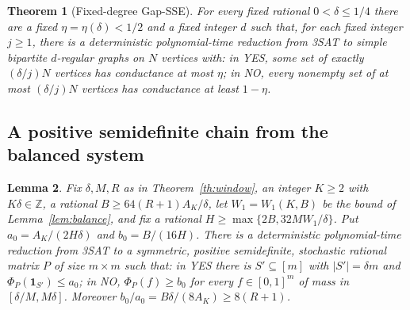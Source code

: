 \documentclass[11pt,letterpaper]{article}
\newtheorem{theorem}{Theorem}[section]
\newtheorem{lemma}[theorem]{Lemma}
\theoremstyle{definition}
\theoremstyle{remark}
\newcommand{\Z}{\mathbb Z}
\newcommand{\ind}{\mathbf 1}
\begin{document}
\begin{theorem}[Fixed-degree Gap-SSE]\label{th:gapsse}
For every fixed rational \(0<\delta\le1/4\) there are a fixed
\(\eta=\eta(\delta)<1/2\) and a fixed integer \(d\) such that, for each fixed
integer \(j\ge1\), there is a deterministic polynomial-time reduction from
3SAT to simple bipartite \(d\)-regular graphs on \(N\) vertices with: in
YES, some set of exactly \((\delta/j)N\) vertices has conductance at most
\(\eta\); in NO, every nonempty set of at most \((\delta/j)N\) vertices has
conductance at least \(1-\eta\).
\end{theorem}

\subsection{A positive semidefinite chain from the balanced system}

\begin{lemma}\label{lem:chain}
Fix \(\delta,M,R\) as in Theorem~\ref{th:window}, an integer \(K\ge2\) with
\(K\delta\in\Z\), a rational \(B\ge64(R+1)A_K/\delta\), let \(W_1=W_1(K,B)\)
be the bound of Lemma~\ref{lem:balance}, and fix a rational
\(H\ge\max\{2B,32MW_1/\delta\}\). Put \(a_0=A_K/(2H\delta)\) and
\(b_0=B/(16H)\). There is a deterministic polynomial-time reduction from
3SAT to a symmetric, positive semidefinite, stochastic rational matrix \(P\)
of size \(m\times m\) such that: in YES there is \(S'\subseteq[m]\) with
\(|S'|=\delta m\) and \(\Phi_P(\ind_{S'})\le a_0\); in NO,
\(\Phi_P(f)\ge b_0\) for every \(f\in[0,1]^m\) of mass in
\([\delta/M,M\delta]\). Moreover \(b_0/a_0=B\delta/(8A_K)\ge8(R+1)\).
\end{lemma}
\end{document}
